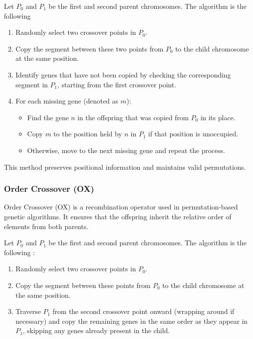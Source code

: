 \documentclass[../main.tex]{subfiles}
\begin{document}
Let $P_0$ and $P_1$ be the first and second parent chromosomes.
The algorithm is the following \cite{crossover-wikipedia}
\begin{enumerate}
    \item Randomly select two crossover points in $P_0$.
    \item Copy the segment between these two points from $P_0$ to the child chromosome at the same position.
    \item Identify genes that have not been copied by checking the corresponding segment in $P_1$, starting from the first crossover point.
    \item For each missing gene (denoted as $m$):
    \begin{itemize}
        \item Find the gene $n$ in the offspring that was copied from $P_0$ in its place.
        \item Copy $m$ to the position held by $n$ in $P_1$ if that position is unoccupied.
        \item Otherwise, move to the next missing gene and repeat the process.
    \end{itemize}
\end{enumerate}

This method preserves positional information and maintains valid permutations.

\subsubsection{Order Crossover (OX)}

Order Crossover (OX) is a recombination operator used in permutation-based genetic algorithms. It ensures that the offspring inherit the relative order of elements from both parents.


Let $P_0$ and $P_1$ be the first and second parent chromosomes.
The algorithm is the following \cite{crossover-wikipedia}:
\begin{enumerate}
    \item Randomly select two crossover points in $P_0$.
    \item Copy the segment between these points from $P_0$ to the child chromosome at the same position.
    \item Traverse $P_1$ from the second crossover point onward (wrapping around if necessary) and copy the remaining genes in the same order as they appear in $P_1$, skipping any genes already present in the child.
\end{enumerate}
\end{document}
